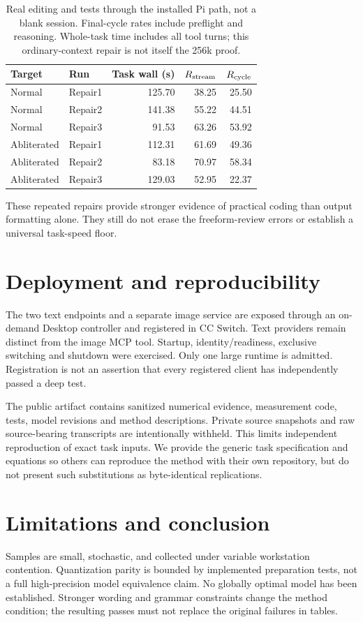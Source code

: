 \documentclass[11pt]{article}
\begin{document}
\begin{table}[H]\centering\small
\begin{tabular}{llrrr}\toprule
Target & Run & Task wall (s) & $R_{\rm stream}$ & $R_{\rm cycle}$\\\midrule
Normal & Repair1 &125.70&38.25&25.50\\
Normal & Repair2 &141.38&55.22&44.51\\
Normal & Repair3 &91.53&63.26&53.92\\
Abliterated & Repair1 &112.31&61.69&49.36\\
Abliterated & Repair2 &83.18&70.97&58.34\\
Abliterated & Repair3 &129.03&52.95&22.37\\\bottomrule
\end{tabular}
\caption{Real editing and tests through the installed Pi path, not a blank session. Final-cycle rates include preflight and reasoning. Whole-task time includes all tool turns; this ordinary-context repair is not itself the 256k proof.}
\end{table}
These repeated repairs provide stronger evidence of practical coding than output formatting alone. They still do not erase the freeform-review errors or establish a universal task-speed floor.

\section{Deployment and reproducibility}
The two text endpoints and a separate image service are exposed through an on-demand Desktop controller and registered in CC Switch. Text providers remain distinct from the image MCP tool. Startup, identity/readiness, exclusive switching and shutdown were exercised. Only one large runtime is admitted. Registration is not an assertion that every registered client has independently passed a deep test.

The public artifact contains sanitized numerical evidence, measurement code, tests, model revisions and method descriptions. Private source snapshots and raw source-bearing transcripts are intentionally withheld. This limits independent reproduction of exact task inputs. We provide the generic task specification and equations so others can reproduce the method with their own repository, but do not present such substitutions as byte-identical replications.

\section{Limitations and conclusion}
Samples are small, stochastic, and collected under variable workstation contention. Quantization parity is bounded by implemented preparation tests, not a full high-precision model equivalence claim. No globally optimal model has been established. Stronger wording and grammar constraints change the method condition; the resulting passes must not replace the original failures in tables.
\end{document}
